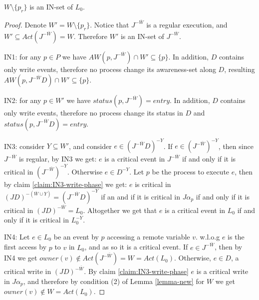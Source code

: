 \begin{claim-subsection}
	$W \setminus \{p_r\}$ is an IN-set of $L_0$.
\end{claim-subsection}

\begin{proof}
	Denote $W' = W \setminus \{p_r\}$. Notice that $J^{-\overline{W}}$ is a regular execution, and $W' \subseteq Act(J^{-\overline{W}}) = W$. Therefore $W'$ is an IN-set of $J^{-\overline{W}}$.
	
	IN1: for any $p \in P$ we have $AW(p,J^{-\overline{W}}) \cap W' \subseteq \{p\}$. In addition, $D$ contains only write events, therefore no process change its awareness-set along $D$, resulting $AW(p,J^{-\overline{W}} D) \cap W' \subseteq \{p\}$.
	
	IN2: for any $p \in W'$ we have $status(p,J^{-\overline{W}}) = entry$.  In addition, $D$ contains only write events, therefore no process change its status in $D$ and $status(p,J^{-\overline{W}} D) = entry$.
	
	IN3: consider $Y \subseteq W'$, and consider $e \in (J^{-\overline{W}} D)^{-Y}$. If $e \in (J^{-\overline{W}})^{-Y}$, then since $J^{-\overline{W}}$ is regular, by IN3 we get: $e$ is a critical event in $J^{-\overline{W}}$ if and only if it is critical in $(J^{-\overline{W}})^{-Y}$. Otherwise $e \in D^{-Y}$. Let $p$ be the process to execute $e$, then by claim \ref{claim:IN3-write-phase} we get: $e$ is critical in $(J D)^{-(\overline{W} \cup Y)} = (J^{-\overline{W}} D)^{-Y}$ if an and if it is critical in $J \alpha_p$ if and only if it is critical in $(J D)^{-\overline{W}} = L_0$.
	Altogether we get that $e$ is a critical event in $L_0$ if and only if it is critical in $L_0^{-Y}$.
	
	IN4: Let $e \in L_0$ be an event by $p$ accessing a remote variable $v$. w.l.o.g $e$ is the first access by $p$ to $v$ in $L_0$, and as so it is a critical event. If $e \in J^{-\overline{W}}$, then by IN4 we get $owner(v) \notin Act(J^{-\overline{W}}) = W =Act(L_0)$. Otherwise, $e \in D$, a critical write in $(J D)^{-\overline{W}}$. By claim \ref{claim:IN3-write-phase} $e$ is a critical write in $J \alpha_p$, and therefore by condition (2) of Lemma \ref{lemma-new} for $W$ we get $owner(v) \notin W = Act(L_0)$.
	

\end{proof}
